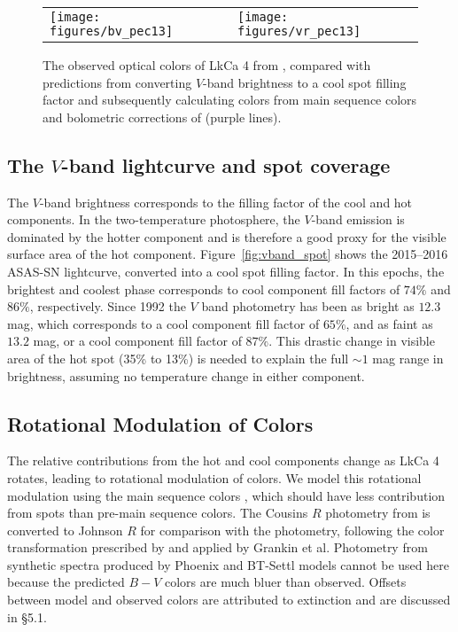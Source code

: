 \documentclass[twocolumn]{emulateapj}%
\begin{document}
\begin{figure*}
 \centering
 \begin{tabular}{ll}
 \texttt{[image: figures/bv\_pec13]} 
    &
   \texttt{[image: figures/vr\_pec13]}
    \end{tabular}
\caption{The observed optical colors of LkCa 4 from \citet{grankin08}, compared with predictions from converting $V$-band brightness to a cool spot filling factor and subsequently calculating colors from main sequence colors and bolometric corrections of \citet{kenyon95} (purple lines).}
\label{fig:colors}
\end{figure*}



\subsection{The $V$-band lightcurve and spot coverage}\label{sec:rotSpot1}

The  $V$-band brightness corresponds to the filling factor of the cool and hot components.  In the two-temperature photosphere, the $V$-band emission is dominated by the hotter component and is therefore a good proxy for the visible surface area of the hot component.  Figure~\ref{fig:vband_spot} shows the 2015--2016 ASAS-SN lightcurve, converted into a cool spot filling factor.  In this epochs, the brightest and coolest phase corresponds to cool component fill factors of $74\%$ and $86\%$, respectively.  Since 1992 the $V$ band photometry has been as bright as $12.3$ mag, which corresponds to a cool component fill factor of $65\%$, and as faint as $13.2$ mag, or a cool component fill factor of $87\%$.  This drastic change in visible area of the hot spot (35\% to 13\%) is needed to explain the full $\sim 1$ mag range in brightness, assuming no temperature change in either component.


\subsection{Rotational Modulation of Colors}\label{sec:rotSpot}

The relative contributions from the hot and cool components change as LkCa 4 rotates, leading to rotational modulation of colors.  We model this rotational modulation using the main sequence colors \citep[compiled by][]{pecaut13}, which should have less contribution from spots than  pre-main sequence colors.  The Cousins $R$ photometry from \citet{pecaut13} is converted to Johnson $R$ for comparison with the \citet{grankin08} photometry, following the color transformation prescribed by \citet{landolt82} and applied by Grankin et al.  Photometry from synthetic spectra produced by Phoenix and BT-Settl models cannot be used here because the predicted $B-V$ colors are much bluer than observed.  Offsets between model and observed colors are attributed to extinction and are discussed in \S 5.1.
\end{document}
